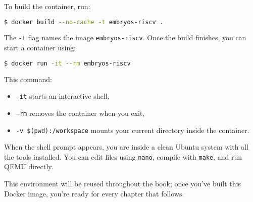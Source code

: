 To build the container, run:

\begin{lstlisting}[style=oscode,language=bash]
$ docker build --no-cache -t embryos-riscv .
\end{lstlisting}

The \texttt{-t} flag names the image \texttt{embryos-riscv}.  
Once the build finishes, you can start a container using:

\begin{lstlisting}[style=oscode,language=bash]
$ docker run -it --rm embryos-riscv
\end{lstlisting}

This command:
\begin{itemize}
  \item \texttt{-it} starts an interactive shell,
  \item \texttt{--rm} removes the container when you exit,
  \item \texttt{-v \$(pwd):/workspace} mounts your current directory inside the container.
\end{itemize}

When the shell prompt appears, you are inside a clean Ubuntu system with all the
tools installed.  You can edit files using \texttt{nano}, compile with
\texttt{make}, and run QEMU directly.

\bigskip
\noindent
This environment will be reused throughout the book; once you’ve built this
Docker image, you’re ready for every chapter that follows.
